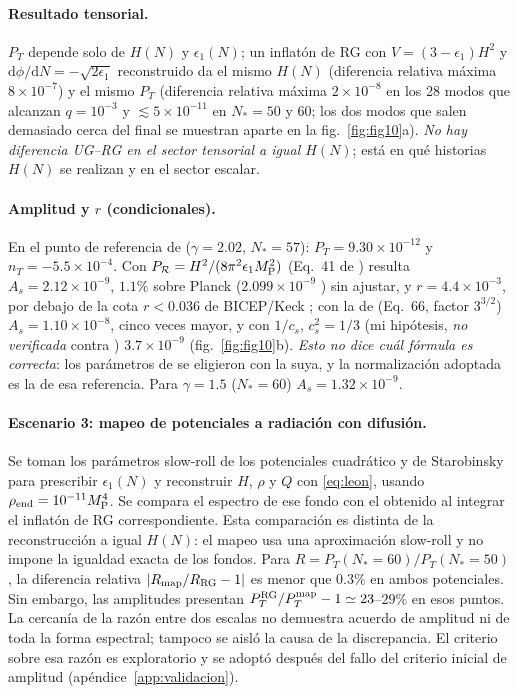 \documentclass[11pt,a4paper]{article}
\numberwithin{equation}{section}
\newcommand{\MP}{M_{\rm P}}\newcommand{\kap}{\kappa}\newcommand{\Lb}{\bar\lambda}\newcommand{\dd}{\mathrm d}\newcommand{\ee}{\mathrm e}
\begin{document}
\paragraph{Resultado tensorial.} $P_T$ depende solo de $H(N)$ y $\epsilon_1(N)$; un inflat\'on de RG con $V=(3-\epsilon_1)H^2$ y $\dd\phi/\dd N=-\sqrt{2\epsilon_1}$ reconstruido da el mismo $H(N)$ (diferencia relativa m\'axima $8\times10^{-7}$) y el mismo $P_T$ (diferencia relativa m\'axima $2\times10^{-8}$ en los 28 modos que alcanzan $q=10^{-3}$ y $\lesssim5\times10^{-11}$ en $N_*=50$ y $60$; los dos modos que salen demasiado cerca del final se muestran aparte en la fig.~\ref{fig:fig10}a). \emph{No hay diferencia UG--RG en el sector tensorial a igual $H(N)$}; est\'a en qu\'e historias $H(N)$ se realizan y en el sector escalar.

\paragraph{Amplitud y $r$ (condicionales).} En el punto de referencia de \cite{piccirilli23} ($\gamma=2.02$, $N_*=57$): $P_T=9.30\times10^{-12}$ y $n_T=-5.5\times10^{-4}$. Con $P_\mathcal{R}=H^2/(8\pi^2\epsilon_1\MP^2)$ (Eq.~41 de \cite{piccirilli23}) resulta $A_s=2.12\times10^{-9}$, $1.1\%$ sobre Planck ($2.099\times10^{-9}$ \cite{planck20}) sin ajustar, y $r=4.4\times10^{-3}$, por debajo de la cota $r<0.036$ de BICEP/Keck \cite{bicep21}; con la de \cite{leon22} (Eq.~66, factor $3^{3/2}$) $A_s=1.10\times10^{-8}$, cinco veces mayor, y con $1/c_s$, $c_s^2=1/3$ (mi hip\'otesis, \emph{no verificada} contra \cite{garriga99}) $3.7\times10^{-9}$ (fig.~\ref{fig:fig10}b). \emph{Esto no dice cu\'al f\'ormula es correcta}: los par\'ametros de \cite{piccirilli23} se eligieron con la suya, y la normalizaci\'on adoptada es la de esa referencia. Para $\gamma=1.5$ ($N_*=60$) $A_s=1.32\times10^{-9}$.

\paragraph{Escenario 3: mapeo de potenciales a radiación con difusión.}
Se toman los parámetros slow-roll de los potenciales cuadrático y de Starobinsky para prescribir $\epsilon_1(N)$ y reconstruir $H$, $\rho$ y $Q$ con \eqref{eq:leon}, usando $\rho_{\rm end}=10^{-11}\MP^4$. Se compara el espectro de ese fondo con el obtenido al integrar el inflatón de RG correspondiente. Esta comparación es distinta de la reconstrucción a igual $H(N)$: el mapeo usa una aproximación slow-roll y no impone la igualdad exacta de los fondos. Para $R=P_T(N_*=60)/P_T(N_*=50)$, la diferencia relativa $|R_{\rm map}/R_{\rm RG}-1|$ es menor que $0.3\%$ en ambos potenciales. Sin embargo, las amplitudes presentan $P_T^{\rm RG}/P_T^{\rm map}-1\simeq23$--$29\%$ en esos puntos. La cercanía de la razón entre dos escalas no demuestra acuerdo de amplitud ni de toda la forma espectral; tampoco se aisló la causa de la discrepancia. El criterio sobre esa razón es exploratorio y se adoptó después del fallo del criterio inicial de amplitud (apéndice~\ref{app:validacion}).
\end{document}
